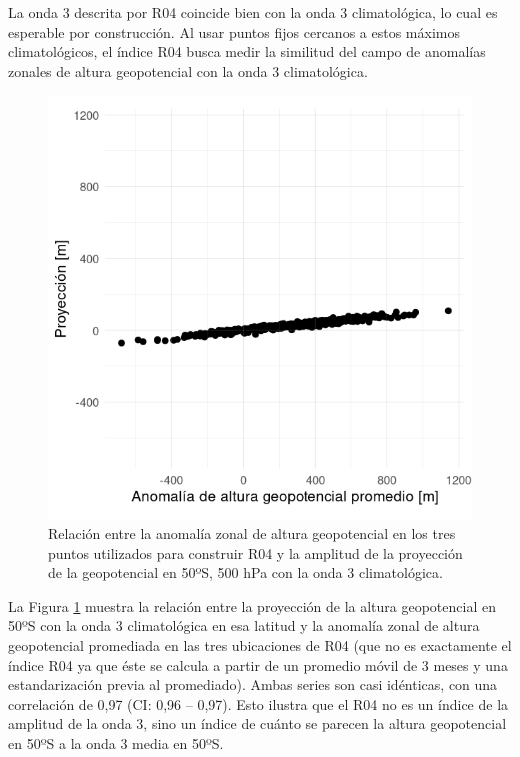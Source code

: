 \documentclass[12pt,oneside,a4paper]{reedthesis}
\begin{document}
La onda 3 descrita por R04 coincide bien con la onda 3 climatológica, lo cual es esperable por construcción.
Al usar puntos fijos cercanos a estos máximos climatológicos, el índice R04 busca medir la similitud del campo de anomalías zonales de altura geopotencial con la onda 3 climatológica.

\begin{figure}

{\centering \includegraphics{figures/15-onda3/pseudo-raphael-1} 

}

\caption{Relación entre la anomalía zonal de altura geopotencial en los tres puntos utilizados para construir R04 y la amplitud de la proyección de la geopotencial en 50ºS, 500 hPa con la onda 3 climatológica.}\label{fig:pseudo-raphael}
\end{figure}



La Figura \ref{fig:pseudo-raphael} muestra la relación entre la proyección de la altura geopotencial en 50ºS con la onda 3 climatológica en esa latitud y la anomalía zonal de altura geopotencial promediada en las tres ubicaciones de R04 (que no es exactamente el índice R04 ya que éste se calcula a partir de un promedio móvil de 3 meses y una estandarización previa al promediado).
Ambas series son casi idénticas, con una correlación de 0,97 (CI: 0,96 -- 0,97).
Esto ilustra que el R04 no es un índice de la amplitud de la onda 3, sino un índice de cuánto se parecen la altura geopotencial en 50ºS a la onda 3 media en 50ºS.
\end{document}
